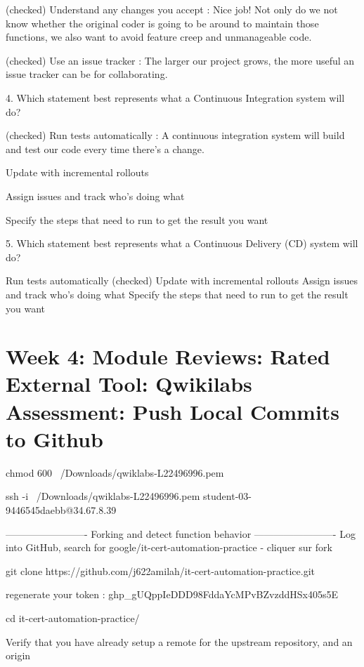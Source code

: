 \documentclass[11pt, onecolumn]{article}
\begin{document}
(checked) Understand any changes you accept : Nice job! Not only do we not know whether the original coder is going to be around to maintain those functions, we also want to avoid feature creep and unmanageable code.

(checked) Use an issue tracker : The larger our project grows, the more useful an issue tracker can be for collaborating.



4. Which statement best represents what a Continuous Integration system will do?

(checked) Run tests automatically  : A continuous integration system will build and test our code every time there's a change.

Update with incremental rollouts

Assign issues and track who's doing what

Specify the steps that need to run to get the result you want



5. Which statement best represents what a Continuous Delivery (CD) system will do?

Run tests automatically
(checked) Update with incremental rollouts
Assign issues and track who's doing what
Specify the steps that need to run to get the result you want




\section{Week 4: Module Reviews: Rated External Tool: Qwikilabs Assessment: Push Local Commits to Github}


chmod 600 ~/Downloads/qwiklabs-L22496996.pem

ssh -i ~/Downloads/qwiklabs-L22496996.pem student-03-9446545daebb@34.67.8.39

-------------------------
Forking and detect function behavior
-------------------------
Log into GitHub, search for google/it-cert-automation-practice - cliquer sur fork 
 
git clone https://github.com/j622amilah/it-cert-automation-practice.git

regenerate your token : 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

cd it-cert-automation-practice/

Verify that you have already setup a remote for the upstream repository, and an origin
\end{document}
